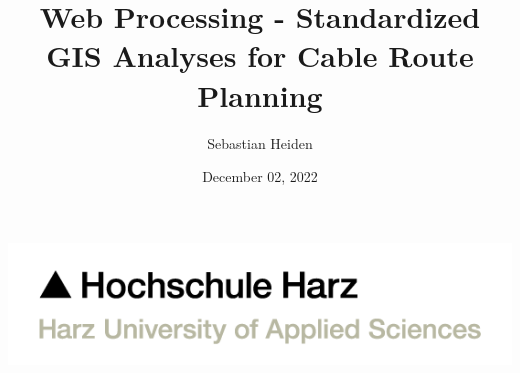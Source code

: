 \documentclass[usenames,dvipsnames,aspectratio=169]{beamer}
\title{Web Processing - Standardized GIS Analyses for Cable Route Planning}
\author{Sebastian Heiden}
\institute{Harz University of Applied Sciences}
\date{December 02, 2022}
\begin{document}
    

\begin{frame}[plain]
	\includegraphics[scale=0.21]{images/3-HSH-Logo-RGB-en.png}
    \maketitle
\end{frame}

	
\end{document}
